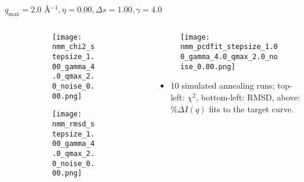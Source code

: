\documentclass{beamer}
\begin{document}
\begin{frame}{$ q_{\textrm{max}}=2.0 $ \AA $^{-1}, \eta=0.00, \Delta s=1.00, \gamma=4.0$}
	\begin{columns}
		\begin{column}{.5\textwidth}
			\begin{figure}[H]
			\centering
			\begin{subfigure}[b]{\textwidth}
				\centering
				\texttt{[image: nmm\_chi2\_stepsize\_1.00\_gamma\_4.0\_qmax\_2.0\_noise\_0.00.png]}
				\label{fig:}
			\end{subfigure}
			\begin{subfigure}[b]{\textwidth}
				\centering
				\texttt{[image: nmm\_rmsd\_stepsize\_1.00\_gamma\_4.0\_qmax\_2.0\_noise\_0.00.png]}
				\label{fig:}
			\end{subfigure}
			\end{figure}
		\end{column}
		\begin{column}{.5\textwidth}
			\begin{figure}[H]
				\centering
				\texttt{[image: nmm\_pcdfit\_stepsize\_1.00\_gamma\_4.0\_qmax\_2.0\_noise\_0.00.png]}
				\label{fig:}
			\end{figure}
			\begin{itemize}
				\item 10 simulated annealing runs; top-left: $\chi^2$, bottom-left: RMSD, above: $\%\Delta I(q)$ fits to the target curve.
			\end{itemize}
		\end{column}
	\end{columns}
\end{frame}
 
\end{document}
